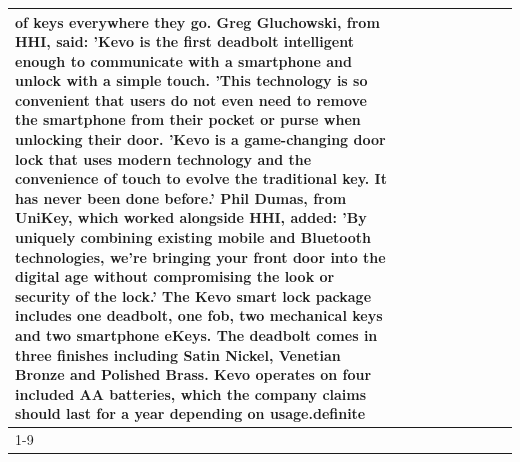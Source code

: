 \begin{table}[H]
\begin{tabular}{lllrlllll}
of keys everywhere they go. Greg Gluchowski, from HHI, said: 'Kevo is the first deadbolt intelligent enough to communicate with a smartphone and unlock with a simple touch. 'This technology is so convenient that users do not even need to remove the smartphone from their pocket or purse when unlocking their door. 'Kevo is a game-changing door lock that uses modern technology and the convenience of touch to evolve the traditional key. It has never been done before.' Phil Dumas, from UniKey, which worked alongside HHI, added: 'By uniquely combining existing mobile and Bluetooth technologies, we’re bringing your front door into the digital age without compromising the look or security of the lock.' The Kevo smart lock package includes one deadbolt, one fob, two mechanical keys and two smartphone eKeys. The deadbolt comes in three finishes including Satin Nickel, Venetian Bronze and Polished Brass. Kevo operates on four included AA batteries, which the company claims should last for a year depending on usage.definite \\
\cline{1-9}

\end{tabular}
\end{table}
